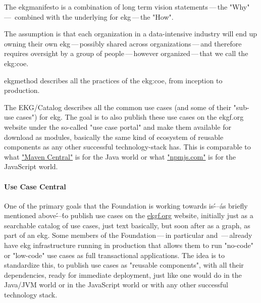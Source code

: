 \begin{description}[font=\bfseries,leftmargin=0cm]
    \item[\gls{ekgmanifesto}] The \gls{ekgmanifesto} is a combination of long term vision statements\,---\,the
                              "Why"\,---\, combined with the underlying 
                              for \gls{ekg}\,---\,the "How".
    \item[\gls{ekgmethod}]    The assumption is that each organization in a data-intensive industry will end up
                              owning their own \gls{ekg}\,---\,possibly shared across organizations\,---\,and therefore
                              requires oversight by a group of people\,---\,however organized\,---\,that we call
                              the \gls{ekg:coe}.

                              \gls{ekgmethod} describes all the practices of the \gls{ekg:coe},
                              from inception to production.
    \item[EKG/Catalog]        The EKG/Catalog describes all the common use cases (and some of their "sub-use cases")
                              for \gls{ekg}.
                              The goal is to also publish these use cases on the ekgf.org website under the so-called
                              "use case portal" and make them available for download as modules, basically the same
                              kind of ecosystem of reusable components as any other successful technology-stack has.
                              This is comparable to what \href{https://central.sonatype.org/}{"Maven Central"} is for
                              the Java world or what \href{https://docs.npmjs.com/about-npm}{"npmjs.com"} is for the
                              JavaScript world.
\end{description}

\paragraph{Use Case Central}

One of the primary goals that the Foundation is working towards is\'---\'as briefly mentioned above\'---\'to publish
use cases on the \href{https://ekgf.org}{ekgf.org} website, initially just as a searchable catalog of use cases,
just text basically, but soon after as a graph, as part of an \gls{ekg}.
Some members of the Foundation\,---\,in particular \agnos and \eccenca\,---\,already have \gls{ekg} infrastructure
running in production that allows them to run "no-code" or "\gls{low-code}" use cases as full transactional applications.
The idea is to standardize this, to publish use cases as "reusable components", with all their dependencies, ready
for immediate deployment, just like one would do in the Java/JVM world or in the JavaScript world or with any
other successful technology stack.

